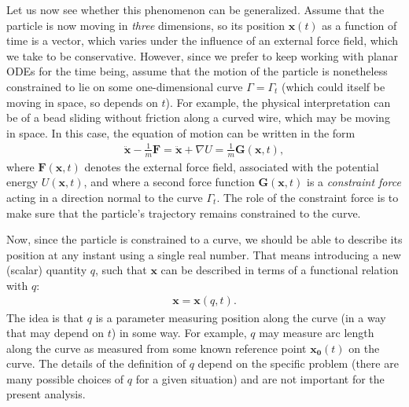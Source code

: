 \documentclass[12pt]{amsart}
\newcommand{\eq}[1]{\begin{equation}\begin{split}#1\end{split}\end{equation}}
\newcommand{\eqst}[1]{\begin{align*}#1\end{align*}}
\newcommand{\grad}{\nabla}
\newcounter{example}
\begin{document}
Let us now see whether this phenomenon can be generalized. Assume that the particle is now moving in \emph{three} dimensions, so its position $\mathbf{x}(t)$ as a function of time is a vector, which varies under the influence of an external force field, which we take to be conservative. However, since we prefer to keep working with planar ODEs for the time being, assume that the motion of the particle is nonetheless constrained to lie on some one-dimensional curve $\Gamma=\Gamma_t$ (which could itself be moving in space, so depends on $t$). For example, the physical interpretation can be of a bead sliding without friction along a curved wire, which may be moving in space. In this case, the equation of motion can be written in the form
\eq{ \label{eq:curve-forces}
\ddot{\mathbf{x}} - \frac{1}{m}\mathbf{F} = \ddot{\mathbf{x}} + \grad U = \frac{1}{m} \mathbf{G}(\mathbf{x},t),
}
where $\mathbf{F}(\mathbf{x},t)$ denotes the external force field, associated with the potential energy $U(\mathbf{x},t)$, and where a second force function $\mathbf{G}(\mathbf{x},t)$ is a \emph{constraint force} acting in a direction normal to the curve $\Gamma_t$. The role of the constraint force is to make sure that the particle's trajectory remains constrained to the curve.

Now, since the particle is constrained to a curve, we should be able to describe its position at any instant using a single real number. That means introducing a new (scalar) quantity $q$, such that $\mathbf{x}$ can be described in terms of a functional relation with $q$:
\eqst { \mathbf{x} = \mathbf{x}(q,t). }
The idea is that $q$ is a parameter measuring position along the curve (in a way that may depend on $t$) in some way. For example, $q$ may measure arc length along the curve as measured from some known reference point $\mathbf{x_0}(t)$ on the curve. The details of the definition of $q$ depend on the specific problem (there are many possible choices of $q$ for a given situation) and are not important for the present analysis.
\end{document}
